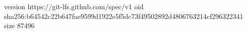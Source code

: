 version https://git-lfs.github.com/spec/v1
oid sha256:b64542c22b647fae9599d1922e5f5dc73f49502892d4806763214cf296322341
size 87496
